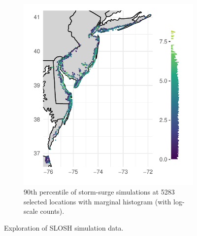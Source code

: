 \begin{figure}[t!]
\begin{subfigure}[t]{0.48\textwidth}
        \includegraphics[width=0.99\linewidth]{./plots/sloshthreshold_loghist.pdf}
        \caption{
            90th percentile of storm-surge simulations at \num{5283} selected 
            locations with marginal histogram (with log-scale counts).
            \label{fig:sloshthreshold}}
    \end{subfigure}
    \caption{Exploration of SLOSH simulation data.\label{fig:sloshexplore}}
\end{figure}

